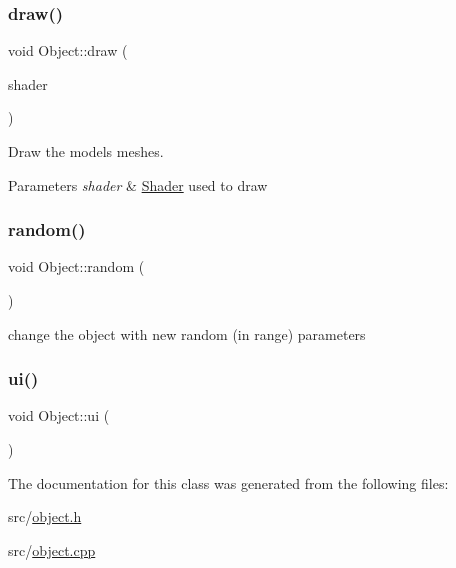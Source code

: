\subsubsection{\texorpdfstring{draw()}{draw()}}
{\footnotesize\ttfamily void Object\+::draw (\begin{DoxyParamCaption}\item[{const \hyperlink{classShader}{Shader} \&}]{shader }\end{DoxyParamCaption})}



Draw the model\textquotesingle{}s meshes. 


\begin{DoxyParams}{Parameters}
{\em shader} & \hyperlink{classShader}{Shader} used to draw \\
\hline
\end{DoxyParams}
\mbox{\label{classObject_ac28acd7323fc00d2522b22b19a10a7d6}} 
\subsubsection{\texorpdfstring{random()}{random()}}
{\footnotesize\ttfamily void Object\+::random (\begin{DoxyParamCaption}{ }\end{DoxyParamCaption})}



change the object with new random (in range) parameters 

\mbox{\label{classObject_a0a9d6c7d2325fc1eb7e5854151a51d09}} 
\subsubsection{\texorpdfstring{ui()}{ui()}}
{\footnotesize\ttfamily void Object\+::ui (\begin{DoxyParamCaption}{ }\end{DoxyParamCaption})}



The documentation for this class was generated from the following files\+:\begin{DoxyCompactItemize}
\item 
src/\hyperlink{object_8h}{object.\+h}\item 
src/\hyperlink{object_8cpp}{object.\+cpp}\end{DoxyCompactItemize}
